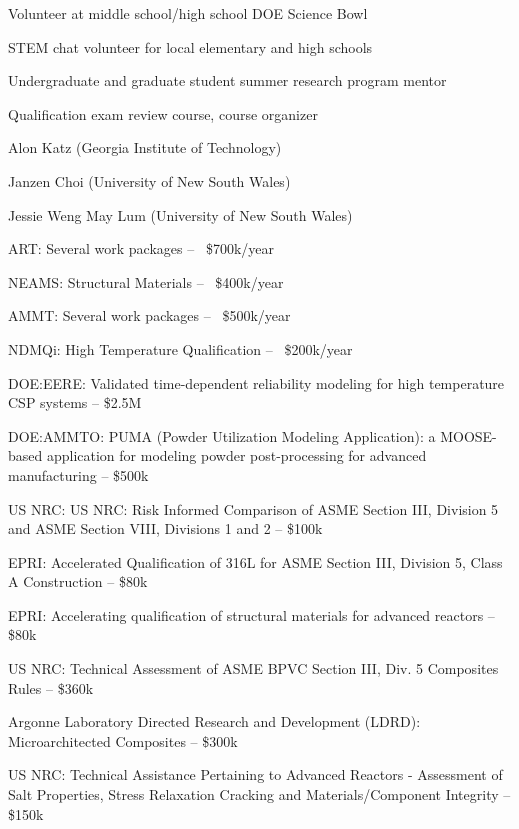 Volunteer at middle school/high school DOE Science Bowl 

STEM chat volunteer for local elementary and high schools 

Undergraduate and graduate student summer research program mentor 

Qualification exam review course, course organizer 


Alon Katz (Georgia Institute of Technology)  

Janzen Choi (University of New South Wales) 

Jessie Weng May Lum (University of New South Wales) 


ART: Several work packages -- ~\$700k/year 

NEAMS: Structural Materials -- ~\$400k/year 

AMMT: Several work packages -- ~\$500k/year 

NDMQi: High Temperature Qualification -- ~\$200k/year 


DOE:EERE: Validated time-dependent reliability modeling for high temperature CSP systems -- \$2.5M 

DOE:AMMTO: PUMA (Powder Utilization Modeling Application): a MOOSE-based application for modeling powder post-processing for advanced manufacturing -- \$500k 

US NRC: US NRC: Risk Informed Comparison of ASME Section III, Division 5 and ASME Section VIII, Divisions 1 and 2 -- \$100k 

EPRI: Accelerated Qualification of 316L for ASME Section III, Division 5, Class A Construction -- \$80k 

EPRI: Accelerating qualification of structural materials for advanced reactors -- \$80k 

US NRC: Technical Assessment of ASME BPVC Section III, Div. 5 Composites Rules -- \$360k 

Argonne Laboratory Directed Research and Development (LDRD): Microarchitected Composites -- \$300k 

US NRC: Technical Assistance Pertaining to Advanced Reactors - Assessment of Salt Properties, Stress Relaxation Cracking and Materials/Component Integrity -- \$150k 

